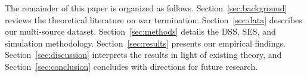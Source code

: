 The remainder of this paper is organized as follows. Section~\ref{sec:background} reviews the theoretical literature on war termination. Section~\ref{sec:data} describes our multi-source dataset. Section~\ref{sec:methods} details the DSS, SES, and simulation methodology. Section~\ref{sec:results} presents our empirical findings. Section~\ref{sec:discussion} interprets the results in light of existing theory, and Section~\ref{sec:conclusion} concludes with directions for future research.
